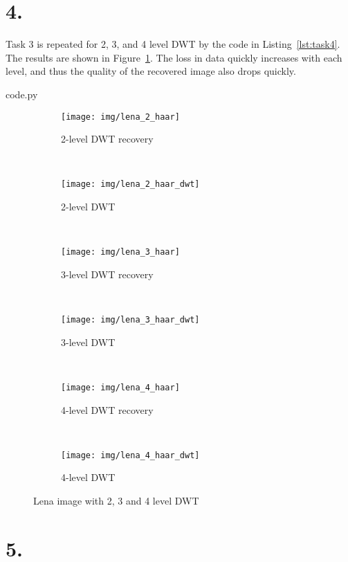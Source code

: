 \section*{4.}

Task 3 is repeated for 2, 3, and 4 level DWT by the code in Listing~\ref{lst:task4}.
The results are shown in Figure~\ref{fig:task4}.
The loss in data quickly increases with each level, and thus the quality of the recovered image also drops quickly.


  {code.py}

\begin{figure}[H]
  \centering
  \begin{subfigure}[t]{0.5\textwidth}
    \centering
    \texttt{[image: img/lena\_2\_haar]}
    \caption{2-level DWT recovery}
  \end{subfigure}%
  ~
  \begin{subfigure}[t]{0.5\textwidth}
    \centering
    \texttt{[image: img/lena\_2\_haar\_dwt]}
    \caption{2-level DWT}
  \end{subfigure}%
  \\
  \begin{subfigure}[t]{0.5\textwidth}
    \centering
    \texttt{[image: img/lena\_3\_haar]}
    \caption{3-level DWT recovery}
  \end{subfigure}%
  ~
  \begin{subfigure}[t]{0.5\textwidth}
    \centering
    \texttt{[image: img/lena\_3\_haar\_dwt]}
    \caption{3-level DWT}
  \end{subfigure}%
  \\
  \begin{subfigure}[t]{0.5\textwidth}
    \centering
    \texttt{[image: img/lena\_4\_haar]}
    \caption{4-level DWT recovery}
  \end{subfigure}%
  ~
  \begin{subfigure}[t]{0.5\textwidth}
    \centering
    \texttt{[image: img/lena\_4\_haar\_dwt]}
    \caption{4-level DWT}
  \end{subfigure}%
  \caption{Lena image with 2, 3 and 4 level DWT}
  \label{fig:task4}
\end{figure}

\section*{5.}

